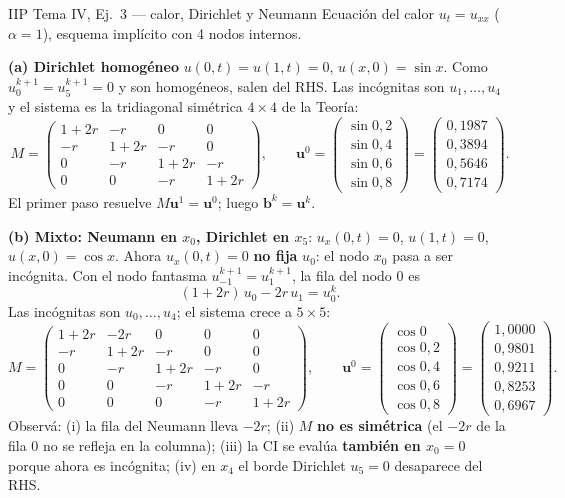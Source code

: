 \begin{ejemplo}{IIP Tema IV, Ej.\ 3 — calor, Dirichlet y Neumann}
Ecuación del calor $u_t=u_{xx}$ ($\alpha=1$), esquema implícito con 4 nodos internos.

\medskip
\textbf{(a) Dirichlet homogéneo} $u(0,t)=u(1,t)=0$, $u(x,0)=\sin x$. Como $u_0^{k+1}=u_5^{k+1}=0$ y son homogéneos, salen del RHS. Las incógnitas son $u_1,\dots,u_4$ y el sistema es la tridiagonal simétrica $4\times4$ de la Teoría:
\[
M=\begin{pmatrix}1+2r&-r&0&0\\-r&1+2r&-r&0\\0&-r&1+2r&-r\\0&0&-r&1+2r\end{pmatrix},\qquad
\mathbf u^0=\begin{pmatrix}\sin0{,}2\\\sin0{,}4\\\sin0{,}6\\\sin0{,}8\end{pmatrix}=\begin{pmatrix}0{,}1987\\0{,}3894\\0{,}5646\\0{,}7174\end{pmatrix}.
\]
El primer paso resuelve $M\mathbf u^1=\mathbf u^0$; luego $\mathbf b^k=\mathbf u^k$.

\medskip
\textbf{(b) Mixto: Neumann en $x_0$, Dirichlet en $x_5$}: $u_x(0,t)=0$, $u(1,t)=0$, $u(x,0)=\cos x$. Ahora $u_x(0,t)=0$ \textbf{no fija} $u_0$: el nodo $x_0$ pasa a ser incógnita. Con el nodo fantasma $u_{-1}^{k+1}=u_1^{k+1}$, la fila del nodo $0$ es
\[
(1+2r)\,u_0-2r\,u_1=u_0^k.
\]
Las incógnitas son $u_0,\dots,u_4$; el sistema crece a $5\times5$:
\[
M=\begin{pmatrix}
1+2r & -2r & 0 & 0 & 0\\
-r & 1+2r & -r & 0 & 0\\
0 & -r & 1+2r & -r & 0\\
0 & 0 & -r & 1+2r & -r\\
0 & 0 & 0 & -r & 1+2r
\end{pmatrix},\qquad
\mathbf u^0=\begin{pmatrix}\cos0\\\cos0{,}2\\\cos0{,}4\\\cos0{,}6\\\cos0{,}8\end{pmatrix}=\begin{pmatrix}1{,}0000\\0{,}9801\\0{,}9211\\0{,}8253\\0{,}6967\end{pmatrix}.
\]
Observá: (i) la fila del Neumann lleva $-2r$; (ii) $M$ \textbf{no es simétrica} (el $-2r$ de la fila 0 no se refleja en la columna); (iii) la CI se evalúa \textbf{también en $x_0=0$} porque ahora es incógnita; (iv) en $x_4$ el borde Dirichlet $u_5=0$ desaparece del RHS.
\end{ejemplo}


